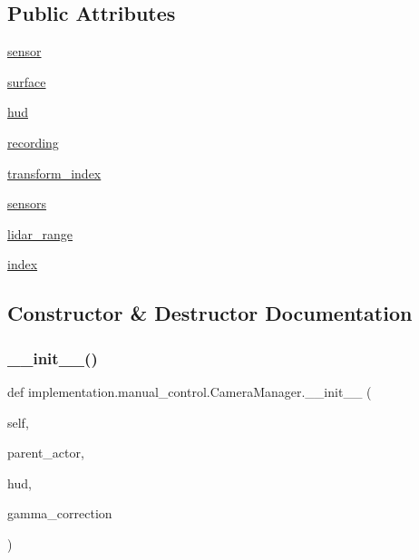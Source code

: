 \subsection*{Public Attributes}
\begin{DoxyCompactItemize}
\item 
\hyperlink{classimplementation_1_1manual__control_1_1_camera_manager_a08823c2f7684b1530c9bb28bb0d196b8}{sensor}
\item 
\hyperlink{classimplementation_1_1manual__control_1_1_camera_manager_a086798f2e17c6ccf3ae167167bb57ca7}{surface}
\item 
\hyperlink{classimplementation_1_1manual__control_1_1_camera_manager_a71d034dbe54b1daf605bf19dd4fe3520}{hud}
\item 
\hyperlink{classimplementation_1_1manual__control_1_1_camera_manager_a733748ba55b4692dfbefed8d6a3d0ff0}{recording}
\item 
\hyperlink{classimplementation_1_1manual__control_1_1_camera_manager_ad13f1309b723167fd9f621e1d787dc62}{transform\+\_\+index}
\item 
\hyperlink{classimplementation_1_1manual__control_1_1_camera_manager_a886aa6e9d84697920fc90c21e5a7d663}{sensors}
\item 
\hyperlink{classimplementation_1_1manual__control_1_1_camera_manager_a84274230a3a05611e594ef29f7394052}{lidar\+\_\+range}
\item 
\hyperlink{classimplementation_1_1manual__control_1_1_camera_manager_a12aa1154aeb3e9dee255fcc207aaead7}{index}
\end{DoxyCompactItemize}


\subsection{Constructor \& Destructor Documentation}
\mbox{\label{classimplementation_1_1manual__control_1_1_camera_manager_ab610af9a3694f6fc76ef1265a9f9d31d}} 
\subsubsection{\texorpdfstring{\+\_\+\+\_\+init\+\_\+\+\_\+()}{\_\_init\_\_()}}
{\footnotesize\ttfamily def implementation.\+manual\+\_\+control.\+Camera\+Manager.\+\_\+\+\_\+init\+\_\+\+\_\+ (\begin{DoxyParamCaption}\item[{}]{self,  }\item[{}]{parent\+\_\+actor,  }\item[{}]{hud,  }\item[{}]{gamma\+\_\+correction }\end{DoxyParamCaption})}



